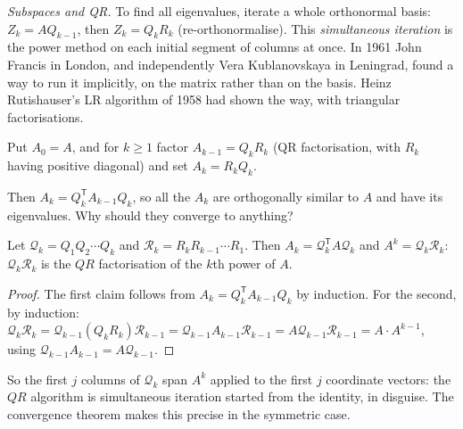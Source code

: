 \emph{Subspaces and QR.} To find all eigenvalues, iterate a whole orthonormal basis: $Z_k=AQ_{k-1}$, then $Z_k=Q_kR_k$ (re-orthonormalise). This
\emph{simultaneous iteration} is the power method on each initial segment of columns at once. In 1961 John Francis in London, and independently Vera
Kublanovskaya in Leningrad, found a way to run it implicitly, on the matrix rather than on the basis. Heinz Rutishauser's LR algorithm of 1958 had shown the
way, with triangular factorisations.

\begin{definition}\label{def:qralg}
Put $A_0=A$, and for $k\ge1$ factor $A_{k-1}=Q_kR_k$ (QR factorisation, with $R_k$ having positive diagonal) and set $A_k=R_kQ_k$.
\end{definition}

Then $A_k=Q_k^{\mathsf T}A_{k-1}Q_k$, so all the $A_k$ are orthogonally similar to $A$ and have its eigenvalues. Why should they converge to anything?

\begin{proposition}\label{prop:qrpowers}
Let $\mathcal Q_k=Q_1Q_2\cdots Q_k$ and $\mathcal R_k=R_kR_{k-1}\cdots R_1$. Then $A_k=\mathcal Q_k^{\mathsf T}A\mathcal Q_k$ and $A^k=\mathcal Q_k\mathcal R_k$:
$\mathcal Q_k\mathcal R_k$ is the $QR$ factorisation of the $k$th power of $A$.
\end{proposition}
\begin{proof}
The first claim follows from $A_k=Q_k^{\mathsf T}A_{k-1}Q_k$ by induction. For the second, by induction:
$\mathcal Q_k\mathcal R_k=\mathcal Q_{k-1}(Q_kR_k)\mathcal R_{k-1}=\mathcal Q_{k-1}A_{k-1}\mathcal R_{k-1}=A\mathcal Q_{k-1}\mathcal R_{k-1}=A\cdot A^{k-1}$,
using $\mathcal Q_{k-1}A_{k-1}=A\mathcal Q_{k-1}$.
\end{proof}

So the first $j$ columns of $\mathcal Q_k$ span $A^k$ applied to the first $j$ coordinate vectors: the $QR$ algorithm is simultaneous iteration started from
the identity, in disguise. The convergence theorem makes this precise in the symmetric case.

